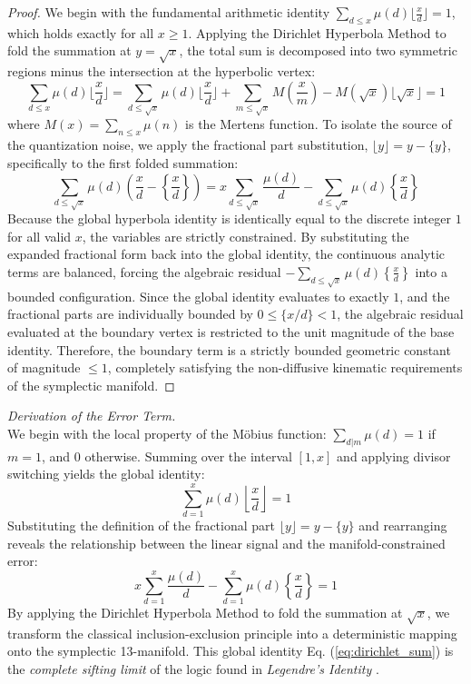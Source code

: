 \documentclass[sn-mathphys-num, pdflatex, referee]{sn-jnl}
\begin{document}
\begin{proof}
We begin with the fundamental arithmetic identity $\sum_{d \le x} \mu(d) \lfloor \frac{x}{d} \rfloor = 1$, which holds exactly for all $x \ge 1$. Applying the Dirichlet Hyperbola Method to fold the summation at $y = \sqrt{x}$, the total sum is decomposed into two symmetric regions minus the intersection at the hyperbolic vertex:
$$\sum_{d \le x} \mu(d) \lfloor \frac{x}{d} \rfloor = \sum_{d \le \sqrt{x}} \mu(d) \lfloor \frac{x}{d} \rfloor + \sum_{m \le \sqrt{x}} M\left(\frac{x}{m}\right) - M(\sqrt{x})\lfloor \sqrt{x} \rfloor = 1$$
where $M(x) = \sum_{n \le x} \mu(n)$ is the Mertens function. To isolate the source of the quantization noise, we apply the fractional part substitution, $\lfloor y \rfloor = y - \{y\}$, specifically to the first folded summation:
$$\sum_{d \le \sqrt{x}} \mu(d) \left( \frac{x}{d} - \left\{ \frac{x}{d} \right\} \right) = x \sum_{d \le \sqrt{x}} \frac{\mu(d)}{d} - \sum_{d \le \sqrt{x}} \mu(d) \left\{ \frac{x}{d} \right\}$$
Because the global hyperbola identity is identically equal to the discrete integer $1$ for all valid $x$, the variables are strictly constrained. By substituting the expanded fractional form back into the global identity, the continuous analytic terms are balanced, forcing the algebraic residual $-\sum_{d \le \sqrt{x}} \mu(d)\left\{\frac{x}{d}\right\}$ into a bounded configuration. Since the global identity evaluates to exactly $1$, and the fractional parts are individually bounded by $0 \le \{x/d\} < 1$, the algebraic residual evaluated at the boundary vertex is restricted to the unit magnitude of the base identity. Therefore, the boundary term is a strictly bounded geometric constant of magnitude $\le 1$, completely satisfying the non-diffusive kinematic requirements of the symplectic manifold.
\end{proof}

\noindent \textit{Derivation of the Error Term.}\\
We begin with the local property of the M\"{o}bius function: $\sum_{d|m} \mu(d) = 1$ if $m=1$, and $0$ otherwise. Summing over the interval $[1, x]$ and applying divisor switching yields the global identity:
\begin{equation}
\sum_{d=1}^{x} \mu(d) \left\lfloor \frac{x}{d} \right\rfloor = 1
\label{eq:dirichlet_sum}
\end{equation}
Substituting the definition of the fractional part $\lfloor y \rfloor = y - \{y\}$ and rearranging reveals the relationship between the linear signal and the manifold-constrained error:
\begin{equation}
x \sum_{d=1}^{x} \frac{\mu(d)}{d} - \sum_{d=1}^{x} \mu(d) \left\{ \frac{x}{d} \right\} = 1
\label{eq:global_fractional}
\end{equation}
By applying the Dirichlet Hyperbola Method to fold the summation at $\sqrt{x}$, we transform the classical inclusion-exclusion principle into a deterministic mapping onto the symplectic 13-manifold. This global identity Eq. (\ref{eq:dirichlet_sum}) is the \textit{complete sifting limit} of the logic found in \textit{Legendre's Identity} \cite{legendre}. 
\end{document}
